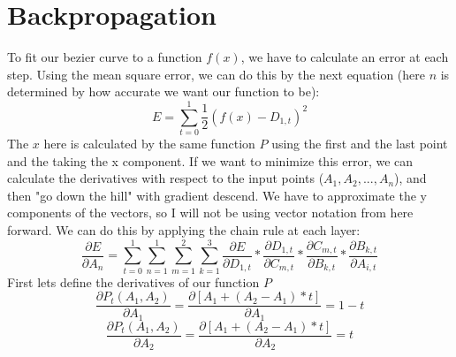 \documentclass{article}
\begin{document}
\section{Backpropagation}
To fit our bezier curve to a function $f(x)$, we have to calculate an error at each step. Using the mean square error, we can do this by the next equation (here $n$ is determined by how accurate we want our function to be):
\begin{equation} \label{eq:5}
    E = \sum_{t=0}^1\frac{1}{2}(f(x) - D_{1,t})^2
\end{equation}
The $x$ here is calculated by the same function $P$ using the first and the last point and the taking the x component.
If we want to minimize this error, we can calculate the derivatives with respect to the input points ($A_1, A_2, ..., A_n$), and then "go down the hill" with gradient descend. We have to approximate the y components of the vectors, so I will not be using vector notation from here forward. We can do this by applying the chain rule at each layer:
\begin{equation}
    \frac{\partial E}{\partial A_n} = \sum_{t=0}^1\sum_{n=1}^1\sum_{m=1}^2\sum_{k=1}^3 \frac{\partial E}{\partial D_{1, t}}*\frac{\partial D_{1, t}}{\partial C_{m, t}}*\frac{\partial C_{m, t}}{\partial B_{k, t}}*\frac{\partial B_{k, t}}{\partial A_{i, t}}
\end{equation}
First lets define the derivatives of our function $P$
\begin{equation} \label{eq:7}
    \frac{\partial P_t(A_1, A_2)}{\partial A_1} = \frac{\partial \left[A_1 + (A_2 - A_1) * t\right]}{\partial A_1} = 1 - t
\end{equation}
\begin{equation}
    \frac{\partial P_t(A_1, A_2)}{\partial A_2} = \frac{\partial \left[A_1 + (A_2 - A_1) * t\right]}{\partial A_2} = t
\end{equation}
\end{document}
